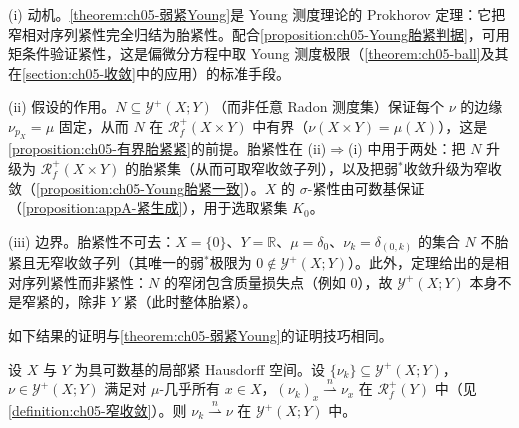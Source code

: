 \documentclass[../../main.tex]{subfiles}%
\begin{document}
\begin{remark}\label{remark:ch05-弱紧Young动机}
(i) 动机。\cref{theorem:ch05-弱紧Young}是 Young 测度理论的 Prokhorov 定理：它把窄相对序列紧性完全归结为胎紧性。配合\cref{proposition:ch05-Young胎紧判据}，可用矩条件验证紧性，这是偏微分方程中取 Young 测度极限（\cref{theorem:ch05-ball}及其在\cref{section:ch05-收敛}中的应用）的标准手段。

(ii) 假设的作用。$N\subseteq\mathcal{Y}^+(X;Y)$（而非任意 Radon 测度集）保证每个 $\nu$ 的边缘 $\nu_{p_X}=\mu$ 固定，从而 $N$ 在 $\mathscr{R}^+_f(X\times Y)$ 中有界（$\nu(X\times Y)=\mu(X)$），这是\cref{proposition:ch05-有界胎紧紧}的前提。胎紧性在 (ii)$\Rightarrow$(i) 中用于两处：把 $N$ 升级为 $\mathscr{R}^+_f(X\times Y)$ 的胎紧集（从而可取窄收敛子列），以及把弱$^*$收敛升级为窄收敛（\cref{proposition:ch05-Young胎紧一致}）。$X$ 的 $\sigma$-紧性由可数基保证（\cref{proposition:appA-紧生成}），用于选取紧集 $K_0$。

(iii) 边界。胎紧性不可去：$X=\{0\}$、$Y=\mathbb{R}$、$\mu=\delta_0$、$\nu_k=\delta_{(0,k)}$ 的集合 $N$ 不胎紧且无窄收敛子列（其唯一的弱$^*$极限为 $0\notin\mathcal{Y}^+(X;Y)$）。此外，定理给出的是相对序列紧性而非紧性：$N$ 的窄闭包含质量损失点（例如 $0$），故 $\mathcal{Y}^+(X;Y)$ 本身不是窄紧的，除非 $Y$ 紧（此时整体胎紧）。
\end{remark}

如下结果的证明与\cref{theorem:ch05-弱紧Young}的证明技巧相同。

\begin{proposition}[逐点窄收敛蕴含窄收敛]\label{proposition:ch05-逐点窄收敛}
设 $X$ 与 $Y$ 为具可数基的局部紧 Hausdorff 空间。设 $\{\nu_k\}\subseteq\mathcal{Y}^+(X;Y)$，$\nu\in\mathcal{Y}^+(X;Y)$ 满足对 $\mu$-几乎所有 $x\in X$，$(\nu_k)_x\stackrel{n}{\rightharpoonup}\nu_x$ 在 $\mathscr{R}^+_f(Y)$ 中（见\cref{definition:ch05-窄收敛}）。则 $\nu_k\stackrel{n}{\rightharpoonup}\nu$ 在 $\mathcal{Y}^+(X;Y)$ 中。
\end{proposition}
\end{document}
